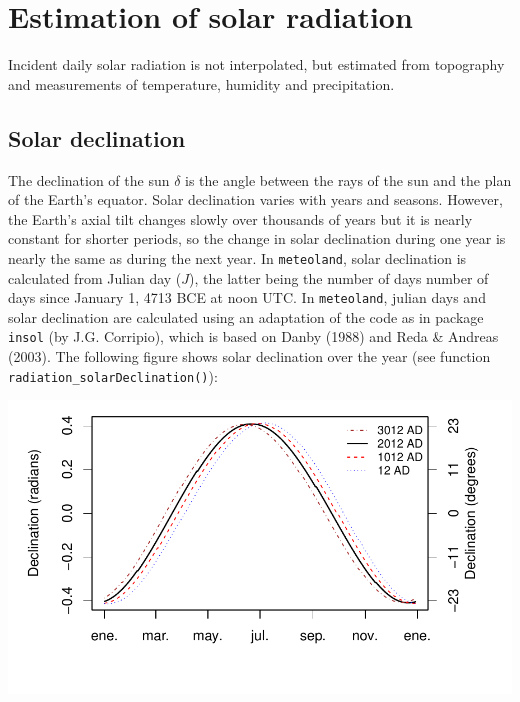 \documentclass[11pt,a4paper]{article}
\begin{document}
\section{Estimation of solar radiation}
Incident daily solar radiation is not interpolated, but estimated from topography and measurements of temperature, humidity and precipitation.


\subsection{Solar declination}
The declination of the sun $\delta$ is the angle between the rays of the sun and the plan of the Earth's equator. Solar declination varies with years and seasons. However, the Earth's axial tilt changes slowly over thousands of years but it is nearly constant for shorter periods, so the change in solar declination during one year is nearly the same as during the next year. In \texttt{meteoland}, solar declination is calculated from Julian day ($J$), the latter being the number of days number of days since January 1, 4713 BCE at noon UTC. In \texttt{meteoland}, julian days and solar declination are calculated using an adaptation of the code as in package \texttt{insol} (by J.G. Corripio), which is based on Danby (1988) and Reda \& Andreas (2003). The following figure shows solar declination over the year (see function \texttt{radiation\_solarDeclination()}):

\begin{center}
\includegraphics{Meteorology-019}
\end{center}
\end{document}
